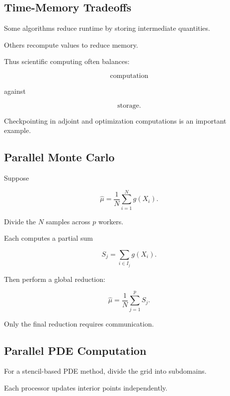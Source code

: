 \subsection{Time-Memory Tradeoffs}
\label{subsec:time-memory-tradeoffs}

Some algorithms reduce runtime by storing intermediate quantities.

Others recompute values to reduce memory.

Thus scientific computing often balances:

\[
\boxed{
\text{computation}
}
\]

against

\[
\boxed{
\text{storage}.
}
\]

Checkpointing in adjoint and optimization computations is an important
example.

\subsection{Parallel Monte Carlo}
\label{subsec:parallel-monte-carlo}

Suppose

\[
\widehat{\mu}
=
\frac1N
\sum_{i=1}^{N}
g(X_i).
\]

Divide the \(N\) samples across \(p\) workers.

Each computes a partial sum

\[
\boxed{
S_j
=
\sum_{i\in I_j}
g(X_i).
}
\]

Then perform a global reduction:

\[
\boxed{
\widehat{\mu}
=
\frac1N
\sum_{j=1}^{p}
S_j.
}
\]

Only the final reduction requires communication.

\subsection{Parallel PDE Computation}
\label{subsec:parallel-pde-computation}

For a stencil-based PDE method, divide the grid into subdomains.

Each processor updates interior points independently.

